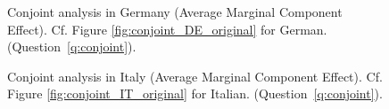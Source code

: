 \begin{figure}[h!]
    \caption[Conjoint analysis in Germany]{Conjoint analysis in Germany (Average Marginal Component Effect). Cf. Figure \ref{fig:conjoint_DE_original} for German. \hfill (Question~\ref{q:conjoint}).
    }\label{fig:conjoint_DE}
\end{figure}

\begin{figure}[h!]
    \caption[Conjoint analysis in Italy]{Conjoint analysis in Italy (Average Marginal Component Effect). Cf. Figure \ref{fig:conjoint_IT_original} for Italian. \hfill (Question~\ref{q:conjoint}).
    }\label{fig:conjoint_IT}
\end{figure}

